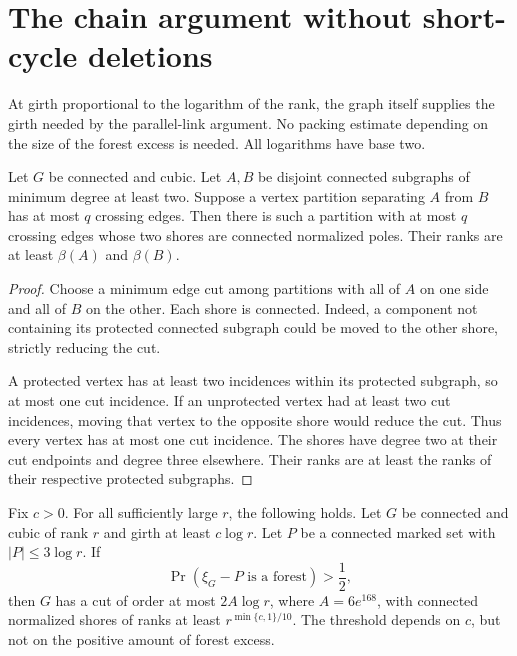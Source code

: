 \section{The chain argument without short-cycle deletions}
\label{sec:random-no-deletion-chain}

At girth proportional to the logarithm of the rank, the graph itself supplies the girth needed by the parallel-link argument.
No packing estimate depending on the size of the forest excess is needed.
All logarithms have base two.

\begin{lemma}
\label{lem:random-protected-core-cut}
Let $G$ be connected and cubic.
Let $A,B$ be disjoint connected subgraphs of minimum degree at least two.
Suppose a vertex partition separating $A$ from $B$ has at most $q$ crossing edges.
Then there is such a partition with at most $q$ crossing edges whose two shores are connected normalized poles.
Their ranks are at least $\beta(A)$ and $\beta(B)$.
\end{lemma}

\begin{proof}
Choose a minimum edge cut among partitions with all of $A$ on one side and all of $B$ on the other.
Each shore is connected.
Indeed, a component not containing its protected connected subgraph could be moved to the other shore, strictly reducing the cut.

A protected vertex has at least two incidences within its protected subgraph, so at most one cut incidence.
If an unprotected vertex had at least two cut incidences, moving that vertex to the opposite shore would reduce the cut.
Thus every vertex has at most one cut incidence.
The shores have degree two at their cut endpoints and degree three elsewhere.
Their ranks are at least the ranks of their respective protected subgraphs.
\end{proof}

\begin{lemma}
\label{lem:random-no-deletion-chain}
Fix $c>0$.
For all sufficiently large $r$, the following holds.
Let $G$ be connected and cubic of rank $r$ and girth at least $c\log r$.
Let $P$ be a connected marked set with $|P|\le3\log r$.
If
\[
 \Pr(\xi_G-P\text{ is a forest})>\frac12,
\]
then $G$ has a cut of order at most $2A\log r$, where $A=6e^{168}$, with connected normalized shores of ranks at least
$r^{\min\{c,1\}/10}$.
The threshold depends on $c$, but not on the positive amount of forest excess.
\end{lemma}

